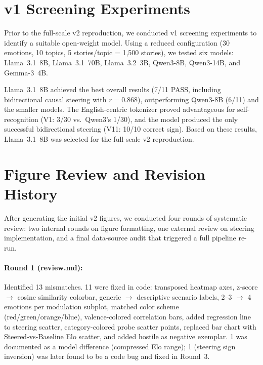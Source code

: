 \documentclass[11pt,a4paper]{article}
\begin{document}
\appendix

\section{v1 Screening Experiments}
\label{app:v1}

Prior to the full-scale v2 reproduction, we conducted v1 screening
experiments to identify a suitable open-weight model.  Using a reduced
configuration (30 emotions, 10 topics, 5 stories/topic = 1{,}500
stories), we tested six models: Llama~3.1~8B, Llama~3.1~70B,
Llama~3.2~3B, Qwen3-8B, Qwen3-14B, and Gemma-3~4B.

Llama~3.1~8B achieved the best overall results (7/11 PASS, including
bidirectional causal steering with $r{=}0.868$), outperforming
Qwen3-8B (6/11) and the smaller models.  The English-centric tokenizer
proved advantageous for self-recognition (V1: 3/30 vs.\ Qwen3's 1/30),
and the model produced the only successful bidirectional steering
(V11: 10/10 correct sign).  Based on these results, Llama~3.1~8B was
selected for the full-scale v2 reproduction.

\section{Figure Review and Revision History}
\label{app:revisions}

After generating the initial v2 figures, we conducted four rounds of
systematic review: two internal rounds on figure formatting, one
external review on steering implementation, and a final data-source
audit that triggered a full pipeline re-run.

\paragraph{Round 1 (review.md):} Identified 13 mismatches.  11 were
fixed in code: transposed heatmap axes, z-score $\to$ cosine similarity
colorbar, generic $\to$ descriptive scenario labels, 2--3 $\to$ 4
emotions per modulation subplot, matched color scheme (red/green/orange/blue),
valence-colored correlation bars, added regression line to steering
scatter, category-colored probe scatter points, replaced bar chart with
Steered-vs-Baseline Elo scatter, and added hostile as negative exemplar.
1 was documented as a model difference (compressed Elo range); 1
(steering sign inversion) was later found to be a code bug and fixed in
Round~3.
\end{document}
